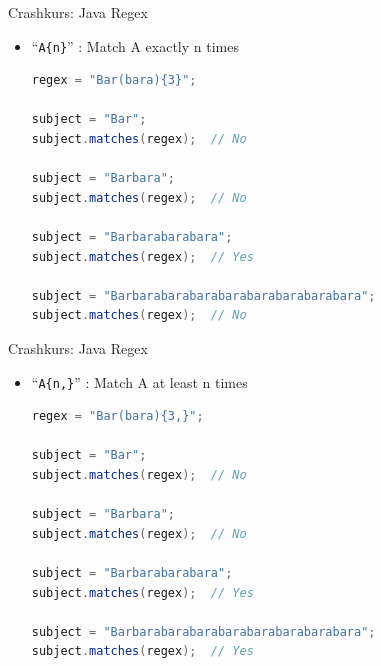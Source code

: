 \documentclass[18pt]{beamer}
\newcommand{\quotes}[1]{``#1''}
\begin{document}
\begin{frame}[fragile]{Crashkurs: Java Regex}
    \begin{itemize}
        \item \Large{\quotes{\alert{\texttt{A\{n\}}}}} : Match A exactly n times

        \vspace{.2in}

        \begin{lstlisting}[language=Java,basicstyle=\scriptsize]
regex = "Bar(bara){3}";

subject = "Bar";
subject.matches(regex);  // No

subject = "Barbara";
subject.matches(regex);  // No

subject = "Barbarabarabara";
subject.matches(regex);  // Yes

subject = "Barbarabarabarabarabarabarabarabara";
subject.matches(regex);  // No
        \end{lstlisting}

    \end{itemize}
\end{frame}

\begin{frame}[fragile]{Crashkurs: Java Regex}
    \begin{itemize}
        \item \Large{\quotes{\alert{\texttt{A\{n,\}}}}} : Match A at least n times

        \vspace{.2in}

        \begin{lstlisting}[language=Java,basicstyle=\scriptsize]
regex = "Bar(bara){3,}";

subject = "Bar";
subject.matches(regex);  // No

subject = "Barbara";
subject.matches(regex);  // No

subject = "Barbarabarabara";
subject.matches(regex);  // Yes

subject = "Barbarabarabarabarabarabarabarabara";
subject.matches(regex);  // Yes
        \end{lstlisting}

    \end{itemize}
\end{frame}
\end{document}
